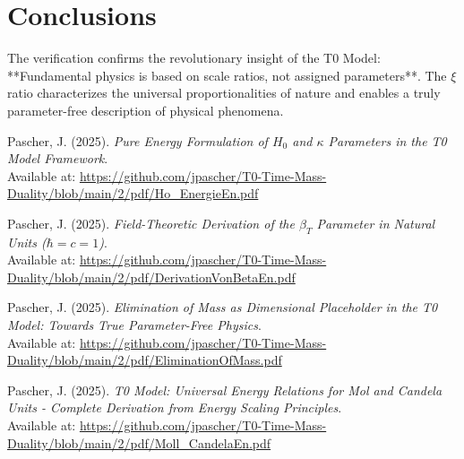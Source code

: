 \documentclass[12pt,a4paper]{article}
\begin{document}
	\section{Conclusions}
	
	The verification confirms the revolutionary insight of the T0 Model: **Fundamental physics is based on scale ratios, not assigned parameters**. The $\xi$ ratio characterizes the universal proportionalities of nature and enables a truly parameter-free description of physical phenomena.
	


	
	\begin{thebibliography}{9}
		
		Pascher, J. (2025). \textit{Pure Energy Formulation of $H_0$ and $\kappa$ Parameters in the T0 Model Framework}. \\
		Available at: \url{https://github.com/jpascher/T0-Time-Mass-Duality/blob/main/2/pdf/Ho_EnergieEn.pdf}
		
		Pascher, J. (2025). \textit{Field-Theoretic Derivation of the $\beta_T$ Parameter in Natural Units ($\hbar = c = 1$)}. \\
		Available at: \url{https://github.com/jpascher/T0-Time-Mass-Duality/blob/main/2/pdf/DerivationVonBetaEn.pdf}
		
		Pascher, J. (2025). \textit{Elimination of Mass as Dimensional Placeholder in the T0 Model: Towards True Parameter-Free Physics}. \\
		Available at: \url{https://github.com/jpascher/T0-Time-Mass-Duality/blob/main/2/pdf/EliminationOfMass.pdf}
		
		Pascher, J. (2025). \textit{T0 Model: Universal Energy Relations for Mol and Candela Units - Complete Derivation from Energy Scaling Principles}. \\
		Available at: \url{https://github.com/jpascher/T0-Time-Mass-Duality/blob/main/2/pdf/Moll_CandelaEn.pdf}
		
	\end{thebibliography}
	
\end{document}
